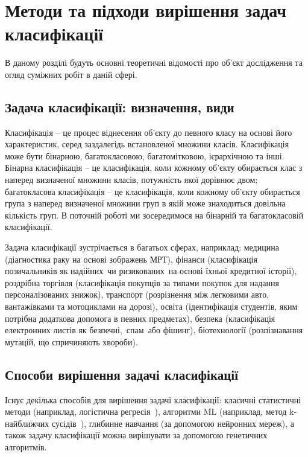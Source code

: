 
\chapter{Методи та підходи вирішення задач класифікації}
\label{chap:review}  %

В даному розділі будуть основні теоретичні відомості про об'єкт дослідження та огляд суміжних робіт в даній сфері.

\section{Задача класифікації: визначення, види}

Класифікація -- це процес віднесення об'єкту до певного класу на основі його характеристик, серед заздалегідь встановленої множини класів. Класифікація може бути бінарною, багатокласовою, багатомітковою, ієрархічною та інші. Бінарна класифікація -- це класифікація, коли кожному об'єкту обирається клас з наперед визначеної множини класів, потужність якої дорівнює двом; багатокласова класифікація -- це класифікація, коли кожному об'єкту обирається група з наперед визначеної множини груп в якій може знаходиться довільна кількість груп. В поточній роботі ми зосередимося на бінарній та багатокласовій класифікації.

Задача класифікації зустрічається в багатьох сферах, наприклад: медицина (діагностика раку на основі зображень МРТ), фінанси (класифікація позичальників як \glqq надійних\grqq\ чи \glqq ризикованих\grqq\ на основі їхньої кредитної історії), роздрібна торгівля (класифікація покупців за типами покупок для надання персоналізованих знижок), транспорт (розрізнення між легковими авто, вантажівками та мотоциклами на дорозі), освіта (ідентифікація студентів, яким потрібна додаткова допомога в певних предметах), безпека (класифікація електронних листів як \glqq безпечні,\grqq\ \glqq спам\grqq\ або \glqq фішинг\grqq), біотехнології (розпізнавання мутацій, що спричиняють хвороби). 

\section{Способи вирішення задачі класифікації}\label{sec:methods_of_solving_the_classification_problem}

Існує декілька способів для вирішення задачі класифікації: класичні статистичні методи (наприклад, логістична регресія~\cite{ct1}), алгоритми ML (наприклад, метод k-найближчих сусідів~\cite{ct4}), глибинне навчання (за допомогою нейронних мереж), а також задачу класифікації можна вирішувати за допомогою генетичних алгоритмів.


